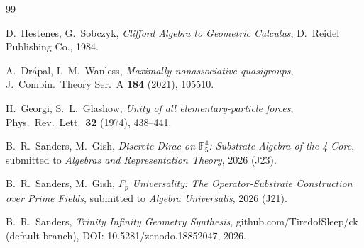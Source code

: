\documentclass[11pt,reqno]{amsart}
\theoremstyle{plain}
\theoremstyle{definition}
\theoremstyle{remark}
\newcommand{\F}{\mathbb{F}}
\begin{document}
\begin{thebibliography}{99}

 D.~Hestenes, G.~Sobczyk,
\emph{Clifford Algebra to Geometric Calculus},
D.~Reidel Publishing Co., 1984.

 A.~Dr\'apal, I.~M.~Wanless,
\emph{Maximally nonassociative quasigroups},
J.~Combin.~Theory Ser.~A \textbf{184} (2021), 105510.

 H.~Georgi, S.~L.~Glashow,
\emph{Unity of all elementary-particle forces},
Phys.~Rev.~Lett.~\textbf{32} (1974), 438--441.

 B.~R.~Sanders, M.~Gish,
\emph{Discrete Dirac on $\F_5^4$: Substrate Algebra of the 4-Core},
submitted to \emph{Algebras and Representation Theory}, 2026 (J23).

 B.~R.~Sanders, M.~Gish,
\emph{F$_p$ Universality: The Operator-Substrate Construction over
Prime Fields}, submitted to \emph{Algebra Universalis}, 2026 (J21).

 B.~R.~Sanders,
\emph{Trinity Infinity Geometry Synthesis},
github.com/TiredofSleep/ck (default branch),
DOI: 10.5281/zenodo.18852047, 2026.

\end{thebibliography}
\end{document}

